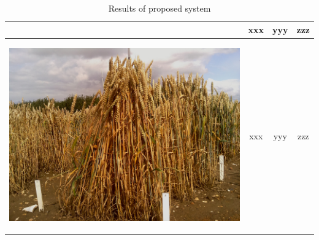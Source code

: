 \begin{table}[h!]
\begin{tabular}{ | c | c | c | c |}
\begin{minipage}{.3\textwidth}
\begin{center}
      \end{center}
    \end{minipage}
    &
      xxx
    & 
      yyy
    & 
      zzz
    \\ \hline
    \begin{minipage}{.3\textwidth}
      \begin{center}
		\includegraphics[width=\linewidth]{Images/006}
      \end{center}
    \end{minipage}
    &
      xxx
    & 
      yyy
    & 
      zzz
    \\ \hline
  \end{tabular}
  \caption{Results of proposed system}\label{tbl:myLboro}
\end{table}



